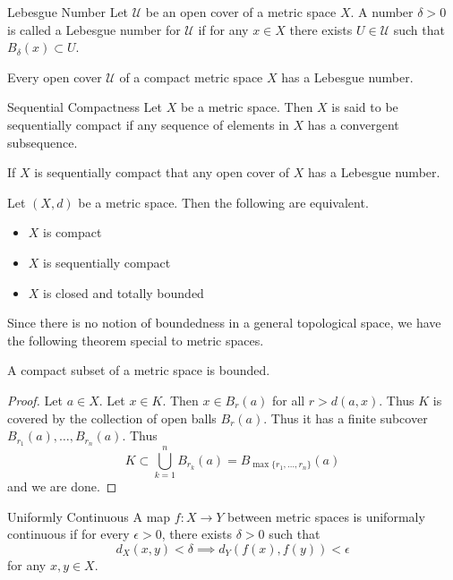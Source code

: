 \documentclass[a4paper]{article}
\begin{document}
\begin{defn}{Lebesgue Number}{} Let $\mathcal{U}$ be an open cover of a metric space $X$. A number $\delta>0$ is called a Lebesgue number for $\mathcal{U}$ if for any $x\in X$ there exists $U\in\mathcal{U}$ such that $B_\delta(x)\subset U$. 
\end{defn}

\begin{lmm}{}{} Every open cover $\mathcal{U}$ of a compact metric space $X$ has a Lebesgue number. 
\end{lmm}

\begin{defn}{Sequential Compactness}{} Let $X$ be a metric space. Then $X$ is said to be sequentially compact if any sequence of elements in $X$ has a convergent subsequence. 
\end{defn}

\begin{lmm}{}{} If $X$ is sequentially compact that any open cover of $X$ has a Lebesgue number. 
\end{lmm}

\begin{prp}{}{} Let $(X,d)$ be a metric space. Then the following are equivalent. 
\begin{itemize}
\item $X$ is compact
\item $X$ is sequentially compact
\item $X$ is closed and totally bounded
\end{itemize}
\end{prp}

Since there is no notion of boundedness in a general topological space, we have the following theorem special to metric spaces. 

\begin{prp}{}{} A compact subset of a metric space is bounded. 
\begin{proof}
Let $a\in X$. Let $x\in K$. Then $x\in B_r(a)$ for all $r>d(a,x)$. Thus $K$ is covered by the collection of open balls $B_r(a)$. Thus it has a finite subcover $B_{r_1}(a),\dots,B_{r_n}(a)$. Thus $$K\subset\bigcup_{k=1}^nB_{r_k}(a)=B_{\max\{r_1,\dots,r_n\}}(a)$$ and we are done. 
\end{proof}
\end{prp}

\begin{defn}{Uniformly Continuous}{} A map $f:X\to Y$ between metric spaces is uniformaly continuous if for every $\epsilon>0$, there exists $\delta>0$ such that $$d_X(x,y)<\delta\implies d_Y(f(x),f(y))<\epsilon$$ for any $x,y\in X$. 
\end{defn}
\end{document}
